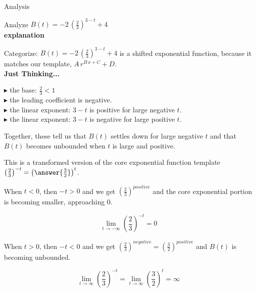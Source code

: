 \documentclass{ximera}
\begin{document}
\begin{example}  Analysis



Analyze   $B(t) = -2 \, \left( \frac{2}{3} \right)^{3-t} + 4$ \\


\textbf{\textcolor{red!75!green}{explanation}} 


Categorize: $B(t) = -2 \, \left( \frac{2}{3} \right)^{3-t} + 4$ is a shifted exponential function, because it matches our template,  $A \, r^{B \, x + C} + D$. \\






\textbf{Just Thinking...}


$\blacktriangleright$  the base: $\frac{2}{3} < 1$ \\
$\blacktriangleright$  the leading coefficient is negative. \\
$\blacktriangleright$  the linear exponent: $3-t$ is positive for large negative $t$. \\
$\blacktriangleright$  the linear exponent: $3-t$ is negative for large positive $t$. 
 


Together, these tell us that $B(t)$ settles down for large negative $t$ and that $B(t)$ becomes unbounded when $t$ is large and positive.



This is a transformed version of the core exponential function template $\left( \frac{2}{3} \right)^{-t} = \left( \answer{\frac{3}{2}} \right)^t$.  



When $t < 0$, then $-t > 0$ and we get  $\left( \frac{2}{3} \right)^{positive}$ and the core exponential portion is becoming smaller, approaching $0$.  





\[ \lim\limits_{t \to -\infty} \left( \frac{2}{3} \right)^{-t}  = 0 \]



When $t > 0$, then $-t < 0$ and we get  $\left( \frac{2}{3} \right)^{negative} = \left( \frac{3}{2} \right)^{positive}$ and $B(t)$ is becoming unbounded.  



\[ \lim\limits_{t \to \infty} \left( \frac{2}{3} \right)^{-t}  = \lim\limits_{t \to \infty} \left( \frac{3}{2} \right)^t  = \infty \]





\end{example}
\end{document}
